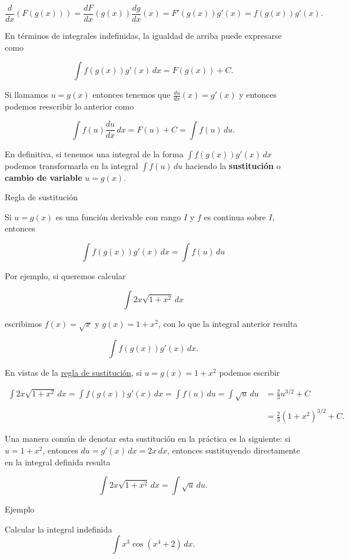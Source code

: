 \documentclass[
  letterpaper,
]{book}
\theoremstyle{plain}
\theoremstyle{remark}
\begin{document}
\[
\frac{d}{dx}\left(F(g(x))\right)=\frac{dF}{dx}(g(x))\frac{dg}{dx}(x)=F'(g(x))
g'(x)=f(g(x))g'(x).
\]

En términos de integrales indefinidas, la igualdad de arriba puede
expresarse como

\[
\int f(g(x))g'(x)\,dx=F(g(x))+C.
\]

Si llamamos \(u=g(x)\) entonces tenemos que
\(\displaystyle \frac{du}{dx}(x)=g'(x)\) y entonces podemos reescribir
lo anterior como

\[
\int f(u)\frac{du}{dx}\,dx=F(u)+C=\int f(u)\,du.
\]

En definitiva, si tenemos una integral de la forma
\(\int f(g(x))g'(x)\,dx\) podemos transformarla en la integral
\(\int f(u)\,du\) haciendo la \textbf{sustitución} o \textbf{cambio de
variable} \(u=g(x)\).

\label{teo-regla-sustitucion}
Regla de sustitución

Si \(u=g(x)\) es una función derivable con rango \(I\) y \(f\) es
continua sobre \(I\), entonces

\[
\int f(g(x))g'(x)\,dx=\int f(u)\,du
\]

Por ejemplo, si queremos calcular

\[
\int 2x \sqrt{1+x^2}\, dx
\]

escribimos \(f(x)=\sqrt{x}\) y \(g(x)=1+x^2\), con lo que la integral
anterior resulta

\[
\int f(g(x))g'(x)\, dx.
\]

En vistas de la \hyperref[teo-regla-sustitucion]{regla de sustitución},
si \(u=g(x)=1+x^2\) podemos escribir

\[
\begin{aligned}
\int 2x \sqrt{1+x^2}\, dx=\int f(g(x))g'(x)\, dx=\int f(u)\,du=\int \sqrt{u}\,du&=\frac{2}{3}u^{3/2}+C\\
\\
&=\frac{2}{3}(1+x^2)^{3/2}+C.
\end{aligned}
\]

Una manera común de denotar esta sustitución en la práctica es la
siguiente: si \(u=1+x^2\), entonces \(du=g'(x)\,dx=2x\,dx\), entonces
sustituyendo directamente en la integral definida resulta

\[
\int 2x \sqrt{1+x^2}\, dx=\int \sqrt{u}\,du.
\]

Ejemplo

Calcular la integral indefinida \[
\int x^3 \cos(x^4+2)\, dx.
\]
\end{document}
